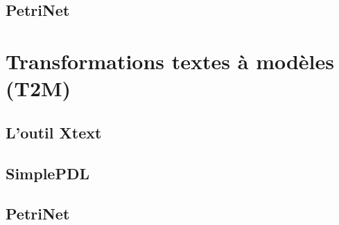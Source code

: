 \documentclass{rapport_gls}
\begin{document}
\section{PetriNet}


\chapter{Transformations textes à modèles (T2M)}
%
\section{L'outil Xtext}
%
\section{SimplePDL}
%
\section{PetriNet}
%
\end{document}

